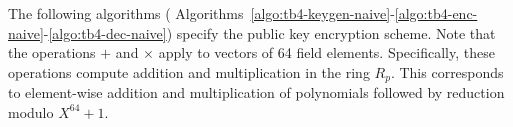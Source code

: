 The following algorithms ( Algorithms~\ref{algo:tb4-keygen-naive}-\ref{algo:tb4-enc-naive}-\ref{algo:tb4-dec-naive}) specify the public key encryption scheme. Note that the operations $+$ and $\times$ apply to vectors of 64 field elements. Specifically, these operations compute addition and multiplication in the ring $R_p$. This corresponds to element-wise addition and multiplication of polynomials followed by reduction modulo $X^{64}+1$.

\begin{algorithm}[!t] \label{algo:tb4-keygen-naive}
\begin{scriptsize}
\caption{\emph{$\mathsf{KeyGen}$}}
\KwIn{}
\end{scriptsize}
\end{algorithm} 

